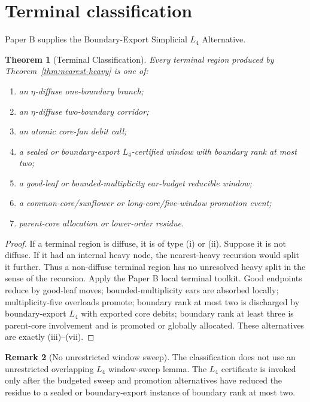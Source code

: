 \documentclass[11pt]{article}
\newtheorem{theorem}{Theorem}[section]
\theoremstyle{definition}
\newtheorem{remark}[theorem]{Remark}
\begin{document}
\section{Terminal classification}

Paper B supplies the Boundary-Export Simplicial \(L_4\) Alternative.

\begin{theorem}[Terminal Classification]
\label{thm:terminal-classification}
Every terminal region produced by Theorem~\ref{thm:nearest-heavy} is one of:
\begin{enumerate}[label=(\roman*)]
    \item an \(\eta\)-diffuse one-boundary branch;
    \item an \(\eta\)-diffuse two-boundary corridor;
    \item an atomic core-fan debit call;
    \item a sealed or boundary-export \(L_4\)-certified window with boundary rank at most two;
    \item a good-leaf or bounded-multiplicity ear-budget reducible window;
    \item a common-core/sunflower or long-core/five-window promotion event;
    \item parent-core allocation or lower-order residue.
\end{enumerate}
\end{theorem}

\begin{proof}
If a terminal region is diffuse, it is of type (i) or (ii). Suppose it is not diffuse. If it had an internal heavy node, the nearest-heavy recursion would split it further. Thus a non-diffuse terminal region has no unresolved heavy split in the sense of the recursion. Apply the Paper B local terminal toolkit. Good endpoints reduce by good-leaf moves; bounded-multiplicity ears are absorbed locally; multiplicity-five overloads promote; boundary rank at most two is discharged by boundary-export \(L_4\) with exported core debits; boundary rank at least three is parent-core involvement and is promoted or globally allocated. These alternatives are exactly (iii)--(vii).
\end{proof}

\begin{remark}[No unrestricted window sweep]
The classification does not use an unrestricted overlapping \(L_4\) window-sweep lemma. The \(L_4\) certificate is invoked only after the budgeted sweep and promotion alternatives have reduced the residue to a sealed or boundary-export instance of boundary rank at most two.
\end{remark}
\end{document}
